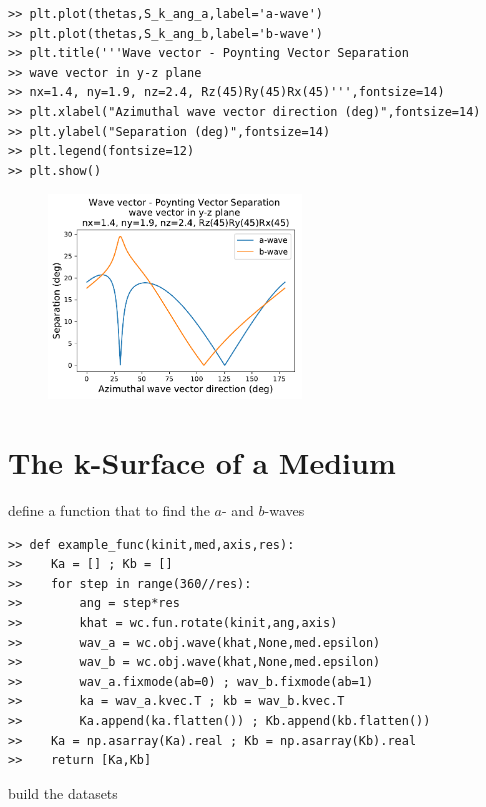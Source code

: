 \documentclass[11pt, reqno]{book}%
\newcounter{ct}
\begin{document}
\begin{verbatim}
>> plt.plot(thetas,S_k_ang_a,label='a-wave')
>> plt.plot(thetas,S_k_ang_b,label='b-wave')
>> plt.title('''Wave vector - Poynting Vector Separation 
>> wave vector in y-z plane 
>> nx=1.4, ny=1.9, nz=2.4, Rz(45)Ry(45)Rx(45)''',fontsize=14)
>> plt.xlabel("Azimuthal wave vector direction (deg)",fontsize=14)
>> plt.ylabel("Separation (deg)",fontsize=14)
>> plt.legend(fontsize=12)
>> plt.show()
\end{verbatim}


\begin{figure}[!htb]
  \begin{centering}
    \includegraphics[width=0.6\textwidth]{test_plots/poynting_vec_separation.pdf}
        \caption{} \label{fig:arbPOYNTING}
      \end{centering}
\end{figure}










\section{The k-Surface of a Medium}
\label{sec:kspace}
define a function that to find the $a$- and $b$-waves
\begin{verbatim}
>> def example_func(kinit,med,axis,res):
>>    Ka = [] ; Kb = []
>>    for step in range(360//res):
>>        ang = step*res
>>        khat = wc.fun.rotate(kinit,ang,axis)
>>        wav_a = wc.obj.wave(khat,None,med.epsilon)
>>        wav_b = wc.obj.wave(khat,None,med.epsilon)
>>        wav_a.fixmode(ab=0) ; wav_b.fixmode(ab=1)
>>        ka = wav_a.kvec.T ; kb = wav_b.kvec.T
>>        Ka.append(ka.flatten()) ; Kb.append(kb.flatten())
>>    Ka = np.asarray(Ka).real ; Kb = np.asarray(Kb).real
>>    return [Ka,Kb]
\end{verbatim}
build the datasets
\end{document}
